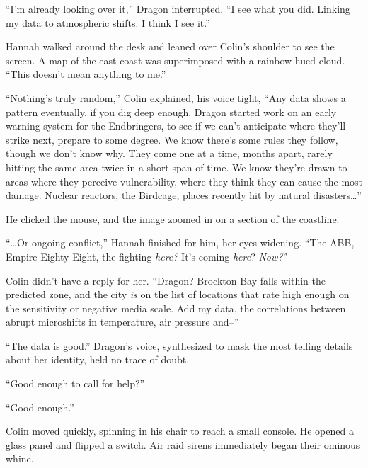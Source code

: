 ``I'm already looking over it,'' Dragon interrupted.  ``I see what you did.  Linking my data to atmospheric shifts.  I think I see it.''



Hannah walked around the desk and leaned over Colin's shoulder to see the screen.  A map of the east coast was superimposed with a rainbow hued cloud.  ``This doesn't mean anything to me.''



``Nothing's truly random,'' Colin explained, his voice tight, ``Any data shows a pattern eventually, if you dig deep enough.  Dragon started work on an early warning system for the Endbringers, to see if we can't anticipate where they'll strike next, prepare to some degree.  We know there's some rules they follow, though we don't know why.  They come one at a time, months apart, rarely hitting the same area twice in a short span of time.  We know they're drawn to areas where they perceive vulnerability, where they think they can cause the most damage.  Nuclear reactors, the Birdcage, places recently hit by natural disasters\ldots''



He clicked the mouse, and the image zoomed in on a section of the coastline.



``\ldots{}Or ongoing conflict,'' Hannah finished for him, her eyes widening.  ``The ABB, Empire Eighty-Eight, the fighting \emph{here?} It's coming \emph{here}? \emph{Now?}''



Colin didn't have a reply for her.  ``Dragon?  Brockton Bay falls within the predicted zone, and the city \emph{is} on the list of locations that rate high enough on the sensitivity or negative media scale.  Add my data, the correlations between abrupt microshifts in temperature, air pressure and--''



``The data is good.'' Dragon's voice, synthesized to mask the most telling details about her identity, held no trace of doubt.



``Good enough to call for help?''



``Good enough.''



Colin moved quickly, spinning in his chair to reach a small console.  He opened a glass panel and flipped a switch.  Air raid sirens immediately began their ominous whine.



